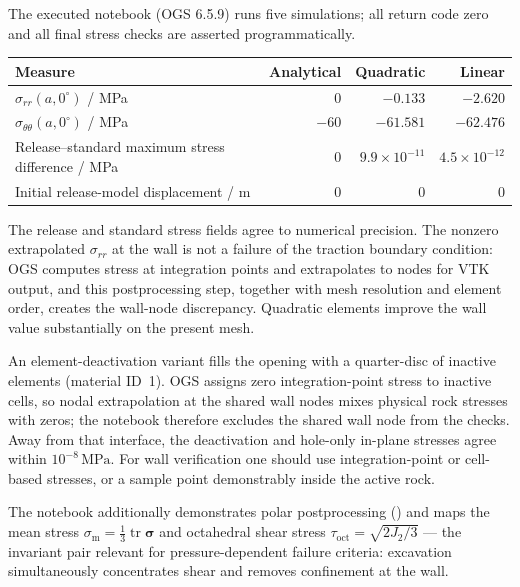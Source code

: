 \documentclass[11pt,a4paper]{tubaf-report}
\newcommand{\ten}[1]{\bm{#1}}
\newcommand{\MPa}{\,\mathrm{MPa}}
\begin{document}
The executed notebook (OGS 6.5.9) runs five simulations; all return code zero
and all final stress checks are asserted programmatically.

\begin{center}
\begin{tabularx}{\textwidth}{@{}Xrrr@{}}
\toprule
Measure & Analytical & Quadratic & Linear \\
\midrule
$\sigma_{rr}(a,0^\circ)$ / MPa & $0$ & $-0.133$ & $-2.620$ \\
$\sigma_{\theta\theta}(a,0^\circ)$ / MPa & $-60$ & $-61.581$ & $-62.476$ \\
Release--standard maximum stress difference / MPa
 & $0$ & $9.9\times10^{-11}$ & $4.5\times10^{-12}$ \\
Initial release-model displacement / m & $0$ & $0$ & $0$ \\
\bottomrule
\end{tabularx}
\end{center}

The release and standard stress fields agree to numerical precision. The
nonzero extrapolated $\sigma_{rr}$ at the wall is not a failure of the
traction boundary condition: OGS computes stress at integration points and
extrapolates to nodes for VTK output, and this postprocessing step, together
with mesh resolution and element order, creates the wall-node discrepancy.
Quadratic elements improve the wall value substantially on the present mesh.

An element-deactivation variant fills the opening with a quarter-disc of
inactive elements (material ID~1). OGS assigns zero integration-point stress
to inactive cells, so nodal extrapolation at the shared wall nodes mixes
physical rock stresses with zeros; the notebook therefore excludes the shared
wall node from the checks. Away from that interface, the deactivation and
hole-only in-plane stresses agree within $10^{-8}\MPa$. For wall
verification one should use integration-point or cell-based stresses, or a
sample point demonstrably inside the active rock.

The notebook additionally demonstrates polar postprocessing
() and maps the mean stress
$\sigma_{\mathrm m}=\tfrac13\operatorname{tr}\ten{\sigma}$ and octahedral
shear stress $\tau_{\mathrm{oct}}=\sqrt{2J_2/3}$ --- the invariant pair
relevant for pressure-dependent failure criteria: excavation simultaneously
concentrates shear and removes confinement at the wall.

\end{document}

